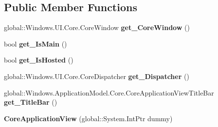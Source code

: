 \subsection*{Public Member Functions}
\begin{DoxyCompactItemize}
\item 
\mbox{\label{class_windows_1_1_application_model_1_1_core_1_1_core_application_view_a7cfe4f4a49ed78d0ae11a16e6cebc507}} 
global\+::\+Windows.\+U\+I.\+Core.\+Core\+Window {\bfseries get\+\_\+\+Core\+Window} ()
\item 
\mbox{\label{class_windows_1_1_application_model_1_1_core_1_1_core_application_view_ae303c87bc500fe45edef23e4dea23518}} 
bool {\bfseries get\+\_\+\+Is\+Main} ()
\item 
\mbox{\label{class_windows_1_1_application_model_1_1_core_1_1_core_application_view_a8dc7e59605e7f56708e128508f7cc977}} 
bool {\bfseries get\+\_\+\+Is\+Hosted} ()
\item 
\mbox{\label{class_windows_1_1_application_model_1_1_core_1_1_core_application_view_a9d7c8b64ee6c13bc8a8e92f9e48c4ccc}} 
global\+::\+Windows.\+U\+I.\+Core.\+Core\+Dispatcher {\bfseries get\+\_\+\+Dispatcher} ()
\item 
\mbox{\label{class_windows_1_1_application_model_1_1_core_1_1_core_application_view_a3019f6ab113ca8bc442c591f5cb35e5d}} 
global\+::\+Windows.\+Application\+Model.\+Core.\+Core\+Application\+View\+Title\+Bar {\bfseries get\+\_\+\+Title\+Bar} ()
\item 
\mbox{\label{class_windows_1_1_application_model_1_1_core_1_1_core_application_view_a7f2958bb867e52abb737c302fe562838}} 
{\bfseries Core\+Application\+View} (global\+::\+System.\+Int\+Ptr dummy)
\item 
\mbox{\label{class_windows_1_1_application_model_1_1_core_1_1_core_application_view_a7cfe4f4a49ed78d0ae11a16e6cebc507}} 

\end{DoxyCompactItemize}
